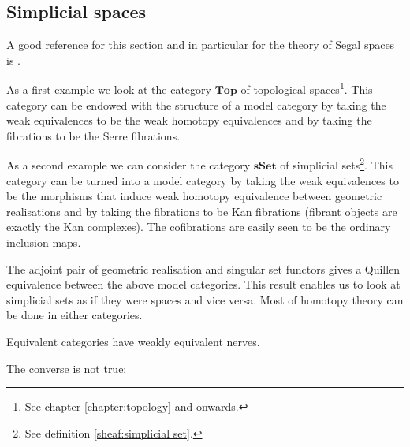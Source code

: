 \subsection{Simplicial spaces}

    A good reference for this section and in particular for the theory of Segal spaces is \cite{rezk}.

    \begin{example}
        As a first example we look at the category $\mathbf{Top}$ of topological spaces\footnote{See chapter \ref{chapter:topology} and onwards.}. This category can be endowed with the structure of a model category by taking the weak equivalences to be the weak homotopy equivalences and by taking the fibrations to be the Serre fibrations.
    \end{example}
    \begin{example}
        As a second example we can consider the category $\mathbf{sSet}$ of simplicial sets\footnote{See definition \ref{sheaf:simplicial set}.}. This category can be turned into a model category by taking the weak equivalences to be the morphisms that induce weak homotopy equivalence between geometric realisations and by taking the fibrations to be Kan fibrations (fibrant objects are exactly the Kan complexes). The cofibrations are easily seen to be the ordinary inclusion maps.
    \end{example}
    \begin{property}
        The adjoint pair of geometric realisation and singular set functors gives a Quillen equivalence between the above model categories. This result enables us to look at simplicial sets as if they were spaces and vice versa. Most of homotopy theory can be done in either categories.
    \end{property}
    \begin{property}
        Equivalent categories have weakly equivalent nerves.
    \end{property}
    The converse is not true:

